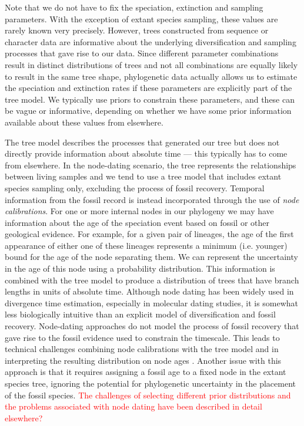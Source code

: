 \documentclass[11pt]{article}
\newcommand{\edit}[1]{{\textcolor{red}{#1}}} %
\begin{document}
Note that we do not have to fix the speciation, extinction and sampling parameters. 
With the exception of extant species sampling, these values are rarely known very precisely. 
However, trees constructed from sequence or character data are informative about the underlying diversification and sampling processes that gave rise to our data.
Since different parameter combinations result in distinct distributions of trees and not all combinations are equally likely to result in the same tree shape, phylogenetic data actually allows us to estimate the speciation and extinction rates if these parameters are explicitly part of the tree model. 
We typically use priors to constrain these parameters, and these can be vague or informative, depending on whether we have some prior information available about these values from elsewhere.

The tree model describes the processes that generated our tree but does not directly provide information about absolute time %
--- this typically has to come from elsewhere.
In the node-dating scenario, the tree represents the relationships between living samples and we tend to use a tree model that includes extant species sampling only, excluding the process of fossil recovery.
Temporal information from the fossil record is instead incorporated through the use of \textit{node calibrations}. 
For one or more internal nodes in our phylogeny we may have information about the age of the speciation event based on fossil or other geological evidence.
For example, for a given pair of lineages, the age of the first appearance of either one of these lineages represents a minimum (i.e. younger) bound for the age of the node separating them.
We can represent the uncertainty in the age of this node using a probability distribution. %
This information is combined with the tree model to produce a distribution of trees that have branch lengths in units of absolute time.
Although node dating has been widely used in divergence time estimation, especially in molecular dating studies, it is somewhat less biologically intuitive than an explicit model of diversification and fossil recovery.
Node-dating approaches do not model the process of fossil recovery that gave rise to the fossil evidence used to constrain the timescale.
This leads to technical challenges combining node calibrations with the tree model and in interpreting the resulting distribution on node ages \cite{Heled2012,Warnock2015}.
Another issue with this approach is that it requires assigning a fossil age to a fixed node in the extant species tree, ignoring the potential for phylogenetic uncertainty in the placement of the fossil species.
\edit{The challenges of selecting different prior distributions and the problems associated with node dating have been described in detail elsewhere?}
\end{document}
